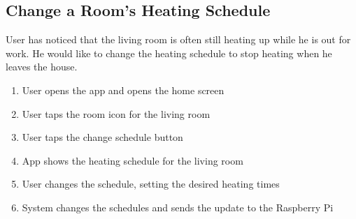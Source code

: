 \subsection{Change a Room's Heating Schedule}
User has noticed that the living room is often still heating up while he is out for work. He would like to change the heating schedule to stop heating when he leaves the house.
\begin{enumerate}
    \item User opens the app and opens the home screen
    \item User taps the room icon for the living room
    \item User taps the change schedule button
    \item App shows the heating schedule for the living room
    \item User changes the schedule, setting the desired heating times
    \item System changes the schedules and sends the update to the Raspberry Pi
\end{enumerate}


